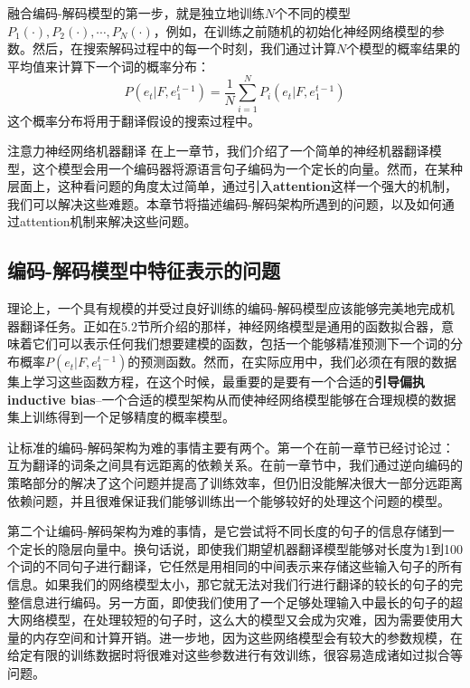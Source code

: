 \documentclass[10pt,a4paper]{ctexart}
\makeatletter
\renewcommand{\section}{\@startsection{section}{1}{0mm}
  {-\baselineskip}{0.5\baselineskip}{\bf\leftline}}
\makeatother
\begin{document}
融合编码-解码模型的第一步，就是独立地训练$N$个不同的模型$P_1(\cdot),P_2(\cdot),\cdots,P_N(\cdot)$，例如，在训练之前随机的初始化神经网络模型的参数。然后，在搜索解码过程中的每一个时刻，我们通过计算$N$个模型的概率结果的平均值来计算下一个词的概率分布：
\[
 P(e_t | F,e_1^{t-1}) = \frac{1}{N} \sum_{i=1}^{N} P_i(e_t | F,e_1^{t-1})
\]
这个概率分布将用于翻译假设的搜索过程中。


\section{注意力神经网络机器翻译}
在上一章节，我们介绍了一个简单的神经机器翻译模型，这个模型会用一个编码器将源语言句子编码为一个定长的向量。然而，在某种层面上，这种看问题的角度太过简单，通过引入\textbf{attention}这样一个强大的机制，我们可以解决这些难题。本章节将描述编码-解码架构所遇到的问题，以及如何通过attention机制来解决这些问题。

\subsection{编码-解码模型中特征表示的问题}
理论上，一个具有规模的并受过良好训练的编码-解码模型应该能够完美地完成机器翻译任务。正如在5.2节所介绍的那样，神经网络模型是通用的函数拟合器，意味着它们可以表示任何我们想要建模的函数，包括一个能够精准预测下一个词的分布概率$P(e_t | F,e_1^{t-1})$的预测函数。然而，在实际应用中，我们必须在有限的数据集上学习这些函数方程，在这个时候，最重要的是要有一个合适的\textbf{引导偏执inductive bias}--一个合适的模型架构从而使神经网络模型能够在合理规模的数据集上训练得到一个足够精度的概率模型。

让标准的编码-解码架构为难的事情主要有两个。第一个在前一章节已经讨论过：互为翻译的词条之间具有远距离的依赖关系。在前一章节中，我们通过逆向编码的策略部分的解决了这个问题并提高了训练效率，但仍旧没能解决很大一部分远距离依赖问题，并且很难保证我们能够训练出一个能够较好的处理这个问题的模型。

第二个让编码-解码架构为难的事情，是它尝试将不同长度的句子的信息存储到一个定长的隐层向量中。换句话说，即使我们期望机器翻译模型能够对长度为1到100个词的不同句子进行翻译，它任然是用相同的中间表示来存储这些输入句子的所有信息。如果我们的网络模型太小，那它就无法对我们行进行翻译的较长的句子的完整信息进行编码。另一方面，即使我们使用了一个足够处理输入中最长的句子的超大网络模型，在处理较短的句子时，这么大的模型又会成为灾难，因为需要使用大量的内存空间和计算开销。进一步地，因为这些网络模型会有较大的参数规模，在给定有限的训练数据时将很难对这些参数进行有效训练，很容易造成诸如过拟合等问题。
\end{document}
